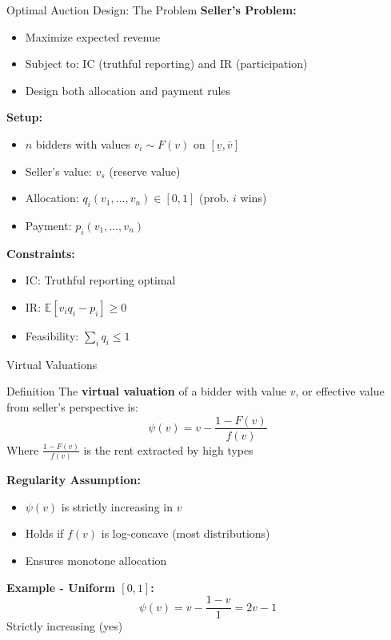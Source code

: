 \documentclass[xcolor={x11names}, aspectratio=169 ]{beamer}
\newcommand{\E}{\mathbb{E}}
\begin{document}
\begin{frame}{Optimal Auction Design: The Problem}
\textbf{Seller's Problem:}
\begin{itemize}
  \item Maximize expected revenue
  \item Subject to: IC (truthful reporting) and IR (participation)
  \item Design both allocation and payment rules
\end{itemize}

\textbf{Setup:}
\begin{itemize}
  \item $n$ bidders with values $v_i \sim F(v)$ on $[\underline{v}, \bar{v}]$
  \item Seller's value: $v_s$ (reserve value)
  \item Allocation: $q_i(v_1, \ldots, v_n) \in [0,1]$ (prob. $i$ wins)
  \item Payment: $p_i(v_1, \ldots, v_n)$
\end{itemize}

\textbf{Constraints:}
\begin{itemize}
  \item IC: Truthful reporting optimal
  \item IR: $\E[v_i q_i - p_i] \geq 0$
  \item Feasibility: $\sum_i q_i \leq 1$
\end{itemize}
\end{frame}

\begin{frame}{Virtual Valuations}
\begin{block}{Definition}
The \textbf{virtual valuation} of a bidder with value $v$, or effective value from seller's perspective is:
$$\psi(v) = v - \frac{1-F(v)}{f(v)}$$
Where $\frac{1-F(v)}{f(v)}$ is the rent extracted by high types
\end{block}

\textbf{Regularity Assumption:}
\begin{itemize}
  \item $\psi(v)$ is strictly increasing in $v$
  \item Holds if $f(v)$ is log-concave (most distributions)
  \item Ensures monotone allocation
\end{itemize}

\textbf{Example - Uniform $[0,1]$:}
$$\psi(v) = v - \frac{1-v}{1} = 2v - 1$$
Strictly increasing (yes)
\end{frame}
\end{document}
